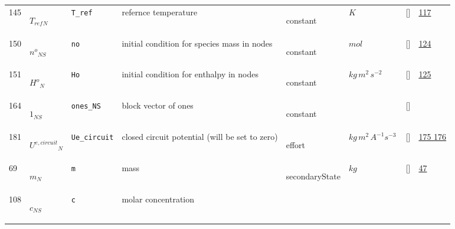 \begin{longtable}{|p{1cm}|p{3cm}|p{3cm}|p{7cm}|p{3.0cm}|p{3cm}|p{2cm}|p{1cm}|}
    145
             & \hypertarget{"v:145"}{ $ {T_{ref}}{_{N}} $}
             & \verb|T_ref|
             & refernce temperature
             & \begin{lay}constant \end{lay}
             & $ K \, $
             & []
             & \hyperlink{"e:117"}{ 117 }
                 \\
    150
             & \hypertarget{"v:150"}{ $ {{n^o}}{_{{N S}}} $}
             & \verb|no|
             & initial condition for species mass in nodes
             & \begin{lay}constant \end{lay}
             & $ mol \, $
             & []
             & \hyperlink{"e:124"}{ 124 }
                 \\
    151
             & \hypertarget{"v:151"}{ $ {{H^o}}{_{N}} $}
             & \verb|Ho|
             & initial condition for enthalpy in nodes
             & \begin{lay}constant \end{lay}
             & $ kg \,m^{2} \,s^{-2} \, $
             & []
             & \hyperlink{"e:125"}{ 125 }
                 \\
    164
             & \hypertarget{"v:164"}{ $ {1}{_{{N S}}} $}
             & \verb|ones_NS|
             & block vector of ones
             & \begin{lay}constant \end{lay}
             & $  $
             & []
             & \\
    181
             & \hypertarget{"v:181"}{ $ {U^{e,circuit}}{_{N}} $}
             & \verb|Ue_circuit|
             & closed circuit potential (will be set to zero)
             & \begin{lay}effort \end{lay}
             & $ kg \,m^{2} \,A^{-1} s^{-3} \, $
             & []
             & \hyperlink{"e:175"}{ 175 }
                 \hyperlink{"e:176"}{ 176 }
                 \\
    69
             & \hypertarget{"v:69"}{ $ {m}{_{N}} $}
             & \verb|m|
             & mass
             & \begin{lay}secondaryState \end{lay}
             & $ kg \, $
             & []
             & \hyperlink{"e:47"}{ 47 }
                 \\
    108
             & \hypertarget{"v:108"}{ $ {c}{_{{N S}}} $}
             & \verb|c|
             & molar concentration

\end{longtable}

